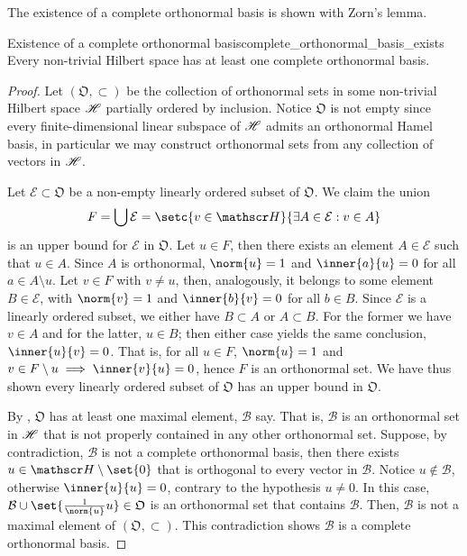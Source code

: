 The existence of a complete orthonormal basis is shown with Zorn's lemma.
\begin{theorem}{Existence of a complete orthonormal basis}{complete_orthonormal_basis_exists}
    Every non-trivial Hilbert space has at least one complete orthonormal basis.
\end{theorem}
\begin{proof}
    Let \((\mathfrak{O}, \subset)\) be the collection of orthonormal sets in some non-trivial Hilbert space \(\mathscr{H}\) partially ordered by inclusion. Notice \(\mathfrak{O}\) is not empty since every finite-dimensional linear subspace of \(\mathscr{H}\) admits an orthonormal Hamel basis, in particular we may construct orthonormal sets from any collection of vectors in \(\mathscr{H}\).

    Let \(\mathcal{E} \subset \mathfrak{O}\) be a non-empty linearly ordered subset of \(\mathfrak{O}\). We claim the union
    \begin{equation*}
        F = \bigcup \mathcal{E} = \setc{v \in \hilbert}{\exists A \in \mathcal{E} : v \in A}
    \end{equation*}
    is an upper bound for \(\mathcal{E}\) in \(\mathfrak{O}\). Let \(u \in F\), then there exists an element \(A \in \mathcal{E}\) such that \(u \in A\). Since \(A\) is orthonormal, \(\norm{u} = 1\) and \(\inner{a}{u} = 0\) for all \(a \in A \setminus{u}\). Let \(v \in F\) with \(v \neq u\), then, analogously, it belongs to some element \(B \in \mathcal{E}\), with \(\norm{v} = 1\) and \(\inner{b}{v} = 0\) for all \(b \in B\). Since \(\mathcal{E}\) is a linearly ordered subset, we either have \(B \subset A\) or \(A \subset B\). For the former we have \(v \in A\) and for the latter, \(u \in B\); then either case yields the same conclusion, \(\inner{u}{v} = 0\). That is, for all \(u \in F\), \(\norm{u} = 1\) and \(v \in F \setminus{u} \implies \inner{v}{u} = 0\), hence \(F\) is an orthonormal set. We have thus shown every linearly ordered subset of \(\mathfrak{O}\) has an upper bound in \(\mathfrak{O}\).

    By , \(\mathfrak{O}\) has at least one maximal element, \(\mathcal{B}\) say. That is, \(\mathcal{B}\) is an orthonormal set in \(\mathscr{H}\) that is not properly contained in any other orthonormal set. Suppose, by contradiction, \(\mathcal{B}\) is not a complete orthonormal basis, then there exists \(u \in \hilbert\setminus\set{0}\) that is orthogonal to every vector in \(\mathcal{B}\). Notice \(u \notin \mathcal{B}\), otherwise \(\inner{u}{u} = 0\), contrary to the hypothesis \(u \neq 0\). In this case, \(\mathcal{B} \cup \set{\frac{1}{\norm{u}}u} \in \mathfrak{O}\) is an orthonormal set that contains \(\mathcal{B}\). Then, \(\mathcal{B}\) is not a maximal element of \((\mathfrak{O}, \subset)\). This contradiction shows \(\mathcal{B}\) is a complete orthonormal basis.
\end{proof}

